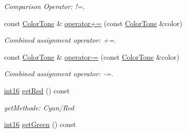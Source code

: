 \begin{DoxyCompactItemize}
\begin{DoxyCompactList}\small\item\em Comparison Operator: !=. \item\end{DoxyCompactList}\item 
\hypertarget{class_f2_c_1_1_color_tone_adfe3ce161ef3dc3465e7b3d032a8fa76}{
const \hyperlink{class_f2_c_1_1_color_tone}{ColorTone} \& \hyperlink{class_f2_c_1_1_color_tone_adfe3ce161ef3dc3465e7b3d032a8fa76}{operator+=} (const \hyperlink{class_f2_c_1_1_color_tone}{ColorTone} \&color)}
\label{class_f2_c_1_1_color_tone_adfe3ce161ef3dc3465e7b3d032a8fa76}

\begin{DoxyCompactList}\small\item\em Combined assignment operator: +=. \item\end{DoxyCompactList}\item 
\hypertarget{class_f2_c_1_1_color_tone_a466a1bd70f8cbe071560484347ddc762}{
const \hyperlink{class_f2_c_1_1_color_tone}{ColorTone} \& \hyperlink{class_f2_c_1_1_color_tone_a466a1bd70f8cbe071560484347ddc762}{operator-\/=} (const \hyperlink{class_f2_c_1_1_color_tone}{ColorTone} \&color)}
\label{class_f2_c_1_1_color_tone_a466a1bd70f8cbe071560484347ddc762}

\begin{DoxyCompactList}\small\item\em Combined assignment operator: -\/=. \item\end{DoxyCompactList}\item 
\hypertarget{class_f2_c_1_1_color_tone_a03bc48742b38e1123150a061d7816a0e}{
\hyperlink{namespace_f2_c_ab83c1e14d784a7d520d770ca6fa8fd8e}{int16} \hyperlink{class_f2_c_1_1_color_tone_a03bc48742b38e1123150a061d7816a0e}{getRed} () const }
\label{class_f2_c_1_1_color_tone_a03bc48742b38e1123150a061d7816a0e}

\begin{DoxyCompactList}\small\item\em getMethode: Cyan/Red \item\end{DoxyCompactList}\item 
\hypertarget{class_f2_c_1_1_color_tone_a357014741cfe8cb1403068c4d6155e1e}{
\hyperlink{namespace_f2_c_ab83c1e14d784a7d520d770ca6fa8fd8e}{int16} \hyperlink{class_f2_c_1_1_color_tone_a357014741cfe8cb1403068c4d6155e1e}{getGreen} () const }
\label{class_f2_c_1_1_color_tone_a357014741cfe8cb1403068c4d6155e1e}


\end{DoxyCompactItemize}
